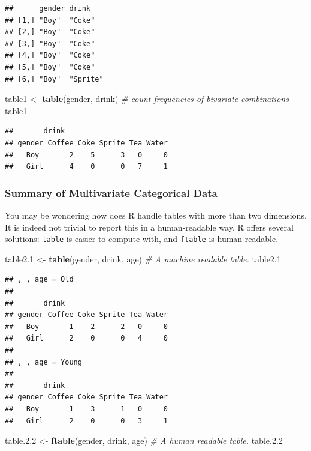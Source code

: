 \documentclass[]{book}
\newenvironment{Shaded}{\begin{snugshade}}{\end{snugshade}}
\newcommand{\KeywordTok}[1]{\textcolor[rgb]{0.13,0.29,0.53}{\textbf{#1}}}
\newcommand{\DecValTok}[1]{\textcolor[rgb]{0.00,0.00,0.81}{#1}}
\newcommand{\FloatTok}[1]{\textcolor[rgb]{0.00,0.00,0.81}{#1}}
\newcommand{\StringTok}[1]{\textcolor[rgb]{0.31,0.60,0.02}{#1}}
\newcommand{\CommentTok}[1]{\textcolor[rgb]{0.56,0.35,0.01}{\textit{#1}}}
\newcommand{\NormalTok}[1]{#1}
\theoremstyle{definition}
\theoremstyle{definition}
\theoremstyle{definition}
\theoremstyle{remark}
\begin{document}
\begin{verbatim}
##      gender drink   
## [1,] "Boy"  "Coke"  
## [2,] "Boy"  "Coke"  
## [3,] "Boy"  "Coke"  
## [4,] "Boy"  "Coke"  
## [5,] "Boy"  "Coke"  
## [6,] "Boy"  "Sprite"
\end{verbatim}

\begin{Shaded}
\begin{Highlighting}[]
\NormalTok{table1 <-}\StringTok{ }\KeywordTok{table}\NormalTok{(gender, drink) }\CommentTok{# count frequencies of bivariate combinations}
\NormalTok{table1                                      }
\end{Highlighting}
\end{Shaded}

\begin{verbatim}
##       drink
## gender Coffee Coke Sprite Tea Water
##   Boy       2    5      3   0     0
##   Girl      4    0      0   7     1
\end{verbatim}

\subsubsection{Summary of Multivariate Categorical
Data}\label{summary-of-multivariate-categorical-data}

You may be wondering how does R handle tables with more than two
dimensions. It is indeed not trivial to report this in a human-readable
way. R offers several solutions: \texttt{table} is easier to compute
with, and \texttt{ftable} is human readable.

\begin{Shaded}
\begin{Highlighting}[]
\NormalTok{table2.}\DecValTok{1}\NormalTok{ <-}\StringTok{ }\KeywordTok{table}\NormalTok{(gender, drink, age) }\CommentTok{# A machine readable table. }
\NormalTok{table2.}\DecValTok{1}
\end{Highlighting}
\end{Shaded}

\begin{verbatim}
## , , age = Old
## 
##       drink
## gender Coffee Coke Sprite Tea Water
##   Boy       1    2      2   0     0
##   Girl      2    0      0   4     0
## 
## , , age = Young
## 
##       drink
## gender Coffee Coke Sprite Tea Water
##   Boy       1    3      1   0     0
##   Girl      2    0      0   3     1
\end{verbatim}

\begin{Shaded}
\begin{Highlighting}[]
\NormalTok{table.}\FloatTok{2.2}\NormalTok{ <-}\StringTok{ }\KeywordTok{ftable}\NormalTok{(gender, drink, age) }\CommentTok{# A human readable table.}
\NormalTok{table.}\FloatTok{2.2}
\end{Highlighting}
\end{Shaded}
\end{document}
